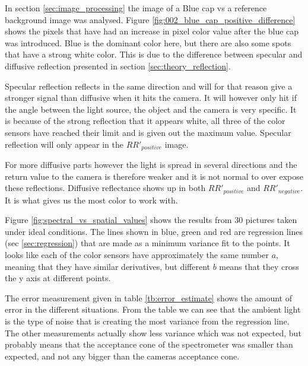 In section \ref{sec:image_processing} the image of a Blue cap vs a reference background image was analysed. 
Figure \ref{fig:002_blue_cap_positive_difference} shows the pixels that have had an increase in pixel color value after the blue cap was introduced. Blue is the dominant color here, but there are also some spots that have a strong white color. This is due to the difference between specular and diffusive reflection presented in section \ref{sec:theory_reflection}. 

Specular reflection reflects in the same direction and will for that reason give a stronger signal than diffusive when it hits the camera. It will however only hit if the angle between the light source, the object and the camera is very specific. It is because of the strong reflection that it appears white, all three of the color sensors have reached their limit and is given out the maximum value. Specular reflection will only appear in the $RR'_{positive}$ image. 

For more diffusive parts however the light is spread in several directions and the return value to the camera is therefore weaker and it is not normal to over expose these reflections. Diffusive reflectance shows up in both $RR'_{positive}$ and $RR'_{negative}$. It is what gives us the most color to work with. 


Figure \ref{fig:spectral_vs_spatial_values} shows the results from 30 pictures taken under ideal conditions. The lines shown in blue, green and red are regression lines (sec \ref{sec:regression}) that are made as a minimum variance fit to the points. It looks like each of the color sensors have approximately the same number $a$, meaning that they have similar derivatives, but different $b$ means that they cross the y axis at different points. 

The error measurement given in table \ref{tb:error_estimate} shows the amount of error in the different situations. From the table we can see that the ambient light is the type of noise that is creating the most variance from the regression line. The other measurements actually show less variance which was not expected, but probably means that the acceptance cone of the spectrometer was smaller than expected, and not any bigger than the cameras acceptance cone. 

